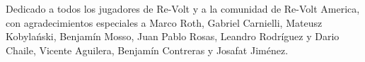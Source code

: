Dedicado a todos los jugadores de Re-Volt y a la comunidad de Re-Volt America, con agradecimientos especiales a Marco Roth, Gabriel Carnielli, Mateusz Kobylański, Benjamín Mosso, Juan Pablo Rosas, Leandro Rodríguez y Dario Chaile, Vicente Aguilera, Benjamín Contreras y Josafat Jiménez.
